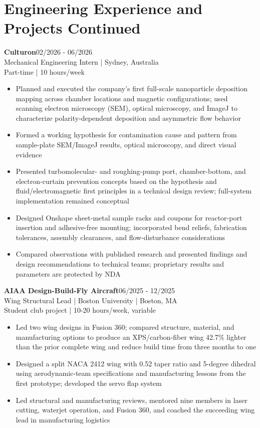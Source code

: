 \documentclass[letterpaper,10pt]{article}
\begin{document}
\section*{Engineering Experience and Projects Continued}
\textbf{Culturon}\hfill 02/2026 - 06/2026\\
Mechanical Engineering Intern | Sydney, Australia\\
Part-time | 10 hours/week
\begin{itemize}[leftmargin=12pt,itemsep=2pt,topsep=2pt,parsep=0pt]
\item Planned and executed the company's first full-scale nanoparticle deposition mapping across chamber locations and magnetic configurations; used scanning electron microscopy (SEM), optical microscopy, and ImageJ to characterize polarity-dependent deposition and asymmetric flow behavior
\item Formed a working hypothesis for contamination cause and pattern from sample-plate SEM/ImageJ results, optical microscopy, and direct visual evidence
\item Presented turbomolecular- and roughing-pump port, chamber-bottom, and electron-curtain prevention concepts based on the hypothesis and fluid/electromagnetic first principles in a technical design review; full-system implementation remained conceptual
\item Designed Onshape sheet-metal sample racks and coupons for reactor-port insertion and adhesive-free mounting; incorporated bend reliefs, fabrication tolerances, assembly clearances, and flow-disturbance considerations
\item Compared observations with published research and presented findings and design recommendations to technical teams; proprietary results and parameters are protected by NDA
\end{itemize}
\textbf{AIAA Design-Build-Fly Aircraft}\hfill 06/2025 - 12/2025\\
Wing Structural Lead | Boston University | Boston, MA\\
Student club project | 10-20 hours/week, variable
\begin{itemize}[leftmargin=12pt,itemsep=2pt,topsep=2pt,parsep=0pt]
\item Led two wing designs in Fusion 360; compared structure, material, and manufacturing options to produce an XPS/carbon-fiber wing 42.7\% lighter than the prior complete wing and reduce build time from three months to one
\item Designed a split NACA 2412 wing with 0.52 taper ratio and 5-degree dihedral using aerodynamic-team specifications and manufacturing lessons from the first prototype; developed the servo flap system
\item Led structural and manufacturing reviews, mentored nine members in laser cutting, waterjet operation, and Fusion 360, and coached the succeeding wing lead in manufacturing logistics
\end{itemize}
\end{document}
